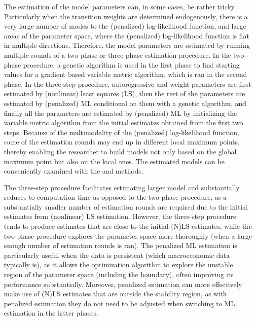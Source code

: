 \documentclass[nojss]{jss}
\begin{document}
The estimation of the model parameters can, in some cases, be rather tricky. Particularly when the transition weights are determined endogenously, there is a very large number of modes to the (penalized) log-likelihood function, and large areas of the parameter space, where the (penalized) log-likelihood function is flat in multiple directions. Therefore, the model parameters are estimated by running multiple rounds of a two-phase or three phase estimation procedure. In the two-phase procedure, a genetic algorithm is used in the first phase to find starting values for a gradient based variable metric algorithm, which is ran in the second phase. In the three-step procedure, autoregressive and weight parameters are first estimated by (nonlinear) least squares (LS), then the rest of the parameters are estimated by (penalized) ML conditional on them with a genetic algorithm, and finally all the parameters are estimated by (penalized) ML by initializing the variable metric algorithm from the initial estimates obtained from the first two steps. Because of the multimodality of the (penalized) log-likelihood function, some of the estimation rounds may end up in different local maximum points, thereby enabling the researcher to build models not only based on the global maximum point but also on the local ones. The estimated models can be conveniently examined with the  and  methods.

The three-step procedure facilitates estimating larger model and substantially reduces to computation time as opposed to the two-phase procedure, as a substantially smaller number of estimation rounds are required due to the initial estimates from (nonlinear) LS estimation. However, the three-step procedure tends to produce estimates that are close to the initial (N)LS estimates, while the two-phase procedure explores the parameter space more thoroughly (when a large enough number of estimation rounds is ran). The penalized ML estimation is particularly useful when the data is persistent (which macroeconomic data typically is), as it allows the optimization algorithm to explore the unstable region of the parameter space (including the boundary), often improving its performance substantially. Moreover, penalized estimation can more effectively make use of (N)LS estimates that are outside the stability region, as with penalized estimation they do not need to be adjusted when switching to ML estimation in the latter phases.
\end{document}
